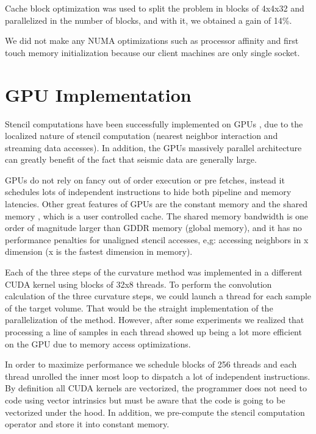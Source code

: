 \documentclass[conference]{IEEEtran}
\begin{document}
Cache block optimization was used to split the problem in blocks of 4x4x32 and parallelized in the number of blocks, and with it, we obtained a gain of 14\%.

We did not make any NUMA optimizations \cite{shaheen} such as processor affinity and first touch memory initialization because our client machines are only single socket.


\section{GPU Implementation} \label{sec:gpu}

Stencil computations have been successfully implemented on GPUs \cite{micikevicius}, due to the localized nature of stencil computation (nearest neighbor interaction and streaming data accesses). In addition, the GPUs massively parallel architecture can greatly benefit of the fact that seismic data are generally large.

GPUs do not rely on fancy out of order execution or pre fetches, instead it schedules lots of independent instructions to hide both pipeline and memory latencies. Other great features of GPUs are the constant memory and the shared memory \cite{micikevicius}\cite{ruetsch}, which is a user controlled cache. The shared memory bandwidth is one order of magnitude larger than GDDR memory (global memory), and it has no performance penalties for unaligned stencil accesses, e,g: accessing neighbors in x dimension (x is the fastest dimension in memory).

Each of the three steps of the curvature method was implemented in a different CUDA kernel using blocks of 32x8 threads. To perform the convolution calculation of the three curvature steps, we could launch a thread for each sample of the target volume. That would be the straight implementation of the parallelization of the method. However, after some experiments we realized that processing a line of samples in each thread showed up being a lot more efficient on the GPU due to memory access optimizations.

In order to maximize performance we schedule blocks of 256 threads and each thread unrolled the inner most loop to dispatch a lot of independent instructions. By definition all CUDA kernels are vectorized, the programmer does not need to code using vector intrinsics but must be aware that the code is going to be vectorized under the hood. In addition, we pre-compute the stencil computation operator and store it into constant memory.
\end{document}
